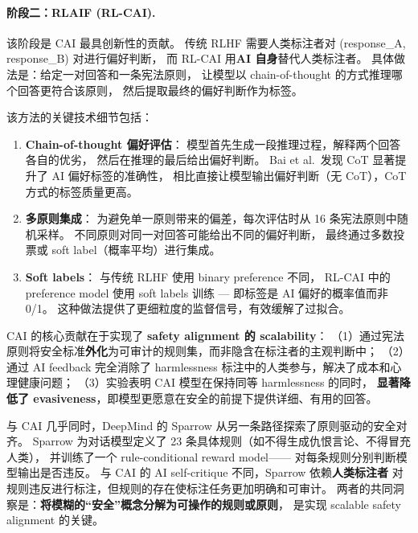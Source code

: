 \paragraph{阶段二：RLAIF (RL-CAI).}
该阶段是 CAI 最具创新性的贡献。
传统 RLHF 需要人类标注者对 (response\_A, response\_B) 对进行偏好判断，
而 RL-CAI 用\textbf{AI 自身}替代人类标注者。
具体做法是：给定一对回答和一条宪法原则，
让模型以 chain-of-thought 的方式推理哪个回答更符合该原则，
然后提取最终的偏好判断作为标签。

该方法的关键技术细节包括：

\begin{enumerate}[leftmargin=2em]
  \item \textbf{Chain-of-thought 偏好评估}：
    模型首先生成一段推理过程，解释两个回答各自的优劣，
    然后在推理的最后给出偏好判断。
    Bai et al.\ 发现 CoT 显著提升了 AI 偏好标签的准确性，
    相比直接让模型输出偏好判断（无 CoT），CoT 方式的标签质量更高。

  \item \textbf{多原则集成}：
    为避免单一原则带来的偏差，每次评估时从 16 条宪法原则中随机采样。
    不同原则对同一对回答可能给出不同的偏好判断，
    最终通过多数投票或 soft label（概率平均）进行集成。

  \item \textbf{Soft labels}：
    与传统 RLHF 使用 binary preference 不同，
    RL-CAI 中的 preference model 使用 soft labels 训练 ---
    即标签是 AI 偏好的概率值而非 0/1。
    这种做法提供了更细粒度的监督信号，有效缓解了过拟合。
\end{enumerate}

\begin{solutionbox}
CAI 的核心贡献在于实现了 \textbf{safety alignment 的 scalability}：
（1）通过宪法原则将安全标准\textbf{外化}为可审计的规则集，而非隐含在标注者的主观判断中；
（2）通过 AI feedback 完全消除了 harmlessness 标注中的人类参与，解决了成本和心理健康问题；
（3）实验表明 CAI 模型在保持同等 harmlessness 的同时，
\textbf{显著降低了 evasiveness}，即模型更愿意在安全的前提下提供详细、有用的回答。
\end{solutionbox}

\noindent
与 CAI 几乎同时，DeepMind 的 Sparrow \citep{glaese2022sparrow}
从另一条路径探索了原则驱动的安全对齐。
Sparrow 为对话模型定义了 23 条具体规则（如不得生成仇恨言论、不得冒充人类），
并训练了一个 rule-conditional reward model——
对每条规则分别判断模型输出是否违反。
与 CAI 的 AI self-critique 不同，Sparrow 依赖\textbf{人类标注者}
对规则违反进行标注，但规则的存在使标注任务更加明确和可审计。
两者的共同洞察是：\textbf{将模糊的``安全''概念分解为可操作的规则或原则}，
是实现 scalable safety alignment 的关键。

